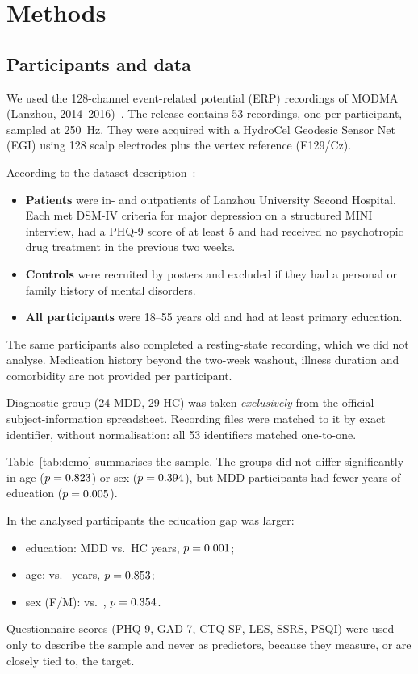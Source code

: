 \section{Methods}

\subsection{Participants and data}
We used the 128-channel event-related potential (ERP) recordings of MODMA (Lanzhou, 2014--2016)~\cite{cai2022modma}.
The release contains 53 recordings, one per participant, sampled at \SI{250}{Hz}. They were acquired with a HydroCel
Geodesic Sensor Net (EGI) using 128 scalp electrodes plus the vertex reference (E129/Cz).

According to the dataset description~\cite{cai2022modma}:
\begin{itemize}
  \item \textbf{Patients} were in- and outpatients of Lanzhou University Second Hospital. Each met DSM-IV criteria
        for major depression on a structured MINI interview, had a PHQ-9 score of at least 5 and had received no
        psychotropic drug treatment in the previous two weeks.
  \item \textbf{Controls} were recruited by posters and excluded if they had a personal or family history of
        mental disorders.
  \item \textbf{All participants} were 18--55 years old and had at least primary education.
\end{itemize}
The same participants also completed a resting-state recording, which we did not analyse. Medication history beyond
the two-week washout, illness duration and comorbidity are not provided per participant.

Diagnostic group (24 MDD, 29 HC) was taken \emph{exclusively} from the official subject-information spreadsheet.
Recording files were matched to it by exact identifier, without normalisation: all 53 identifiers matched one-to-one.

Table~\ref{tab:demo} summarises the sample. The groups did not differ significantly in age ($p=0.823$) or sex
($p=0.394$), but MDD participants had fewer years of education ($p=0.005$).

In the \NIncluded{} analysed participants the education gap was larger:
\begin{itemize}
  \item education: MDD \AudDemoEduMdd{} vs.\ HC \AudDemoEduHc{} years, $p=0.001$;
  \item age: \AudDemoAgeMdd{} vs.\ \AudDemoAgeHc{} years, $p=0.853$;
  \item sex (F/M): \AudDemoSexMdd{} vs.\ \AudDemoSexHc, $p=0.354$.
\end{itemize} Questionnaire scores
(PHQ-9, GAD-7, CTQ-SF, LES, SSRS, PSQI) were used only to describe the sample and never as predictors, because they
measure, or are closely tied to, the target.

